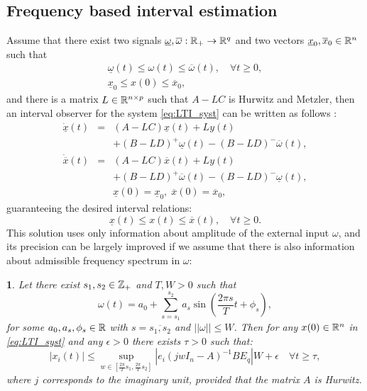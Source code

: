 \documentclass[twocolumn,english]{IEEEtran}
\theoremstyle{plain}
\newtheorem{lem}{\protect\lemmaname}
\theoremstyle{definition}
\theoremstyle{plain}
\theoremstyle{plain}
\theoremstyle{remark}
\providecommand{\lemmaname}{Lemma}
\begin{document}
\subsection{Frequency based interval estimation}

Assume that there exist two signals $\underline{\omega},\overline{\omega}:\mathbb{R}_{+}\to\mathbb{R}^{q}$ and two vectors $\underline{x}_{0},\overline{x}_{0}\in\mathbb{R}^{n}$ such that
\begin{gather*}
\underline{\omega}(t)\leq\omega(t)\leq\overline{\omega}(t),\quad\forall t\geq0,\\
\underline{x}_{0}\leq x(0)\leq\overline{x}_{0},
\end{gather*} and there is a matrix $L\in\mathbb{R}^{n\times p}$ such that $A-LC$ is Hurwitz and Metzler, then an interval observer for the system \eqref{eq:LTI_syst} can be written as follows \cite{REZ11}:
\begin{eqnarray}
\dot{\underline{x}}(t) & = & (A-LC)\underline{x}(t)+Ly(t)\nonumber \\
 &  & +(B-LD)^{+}\underline{\omega}(t)-(B-LD)^{-}\overline{\omega}(t),\nonumber \\
\dot{\overline{x}}(t) & = & (A-LC)\overline{x}(t)+Ly(t)\label{eq:IO_LTI}\\
 &  & +(B-LD)^{+}\overline{\omega}(t)-(B-LD)^{-}\underline{\omega}(t),\nonumber \\
 &  & \underline{x}(0)=\underline{x}_{0},\;\overline{x}(0)=\overline{x}_{0},\nonumber 
\end{eqnarray}
guaranteeing the desired interval relations:
\[
\underline{x}(t)\leq x(t)\leq\overline{x}(t),\quad\forall t\geq0.
\]
This solution uses only information about amplitude of the external input $\omega$, and its precision can be largely improved if we assume that there is also information about admissible frequency spectrum in $\omega$:
\begin{lem}
\label{lem:IntFreq} Let there exist $s_{1},s_{2}\in\mathbb{Z}_{+}$ and $T,W>0$
such that
\[
\omega(t)=a_{0}+\sum_{s=s_{1}}^{s_{2}}a_{s}\sin\left(\frac{2\pi s}{T}t+\phi_{s}\right),
\]
for some $a_{0},a_{s},\phi_{s}\in\mathbb{R}$ with $s=\overline{s_{1},s_{2}}$ and $||\omega||\leq W$. Then for any $x(0)\in\mathbb{R}^{n}$ in \eqref{eq:LTI_syst} and any $\epsilon>0$ there exists $\tau>0$ such that:
\[
|x_{i}(t)|\leq\sup_{w\in[\frac{2\pi}{T}s_{1},\frac{2\pi}{T}s_{2}]}|e_{i}(jwI_{n}-A)^{-1}BE_{q}|W+\epsilon\quad\forall t\geq\tau,
\]
where $j$ corresponds to the imaginary unit, provided that the matrix $A$ is Hurwitz.
\end{lem}
\end{document}
